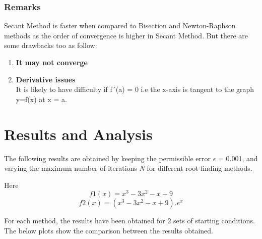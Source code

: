\documentclass[11pt]{article}
\begin{document}
\subsubsection{Remarks}
Secant Method is faster when compared to Bisection and Newton-Raphson methods as the order of convergence is higher in Secant Method. But there are some drawbacks too as follow:
\begin{enumerate}
	\item \textbf{It may not converge}
	
	\item \textbf{Derivative issues}\\
	It is likely to have difficulty if f´(a) = 0 i.e the x-axis is tangent to the graph y=f(x) at x = a.
\end{enumerate}

\section{Results and Analysis}
The following results are obtained by keeping the permissible error $\epsilon$ = 0.001, and varying the maximum number of iterations \textit{N} for different root-finding methods.

Here
\[ f1(x) = x^3 - 3x^2 - x + 9\]
\[ f2(x) = (x^3 - 3x^2 - x + 9).e^x\]

For each method, the results have been obtained for 2 sets of starting conditions. The below plots show the comparison between the results obtained.
\end{document}
